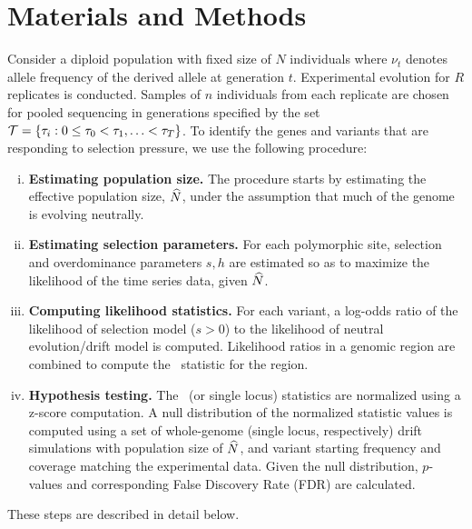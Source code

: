 \section{Materials and Methods}
\label{sec:method}
Consider a diploid population with fixed size of $N$ individuals where
$\nu_t$ denotes allele frequency of the derived allele at generation
$t$. Experimental evolution for $R$ replicates is conducted.  Samples
of $n$ individuals from each replicate are chosen for pooled
sequencing in generations specified by the set ${\cal T}= \{\tau_i: 0\le
\tau_0<\tau_1,\ldots< \tau_T\}$. To identify the genes and variants
that are responding to selection pressure, we use the following
procedure:
\begin{enumerate}[(i)]
\item {\bf Estimating population size.} The procedure starts by
  estimating the effective population size, $\widehat{N}$, under the
  assumption that much of the genome is evolving neutrally.
\item {\bf Estimating selection parameters.} For each polymorphic
  site, selection and overdominance parameters $s,h$ are estimated so
  as to maximize the likelihood of the time series data, given $\widehat{N}$.
\item {\bf Computing likelihood statistics.} For each variant, a
  log-odds ratio of the likelihood of selection model ($s>0$) to the
  likelihood of neutral evolution/drift model is computed. Likelihood
  ratios in a genomic region are combined to compute the \comale\
  statistic for the region.
\item {\bf Hypothesis testing.} The \comale\ (or single locus)
  statistics are normalized using a z-score computation. A null
  distribution of the normalized statistic values is computed using a
  set of whole-genome (single locus, respectively) drift simulations
  with population size of $\widehat{N}$, and variant starting frequency and
  coverage matching the experimental data. Given the null
  distribution, $p$-values and corresponding False Discovery Rate
  (FDR) are calculated.
\end{enumerate}
These steps are described in detail below.
